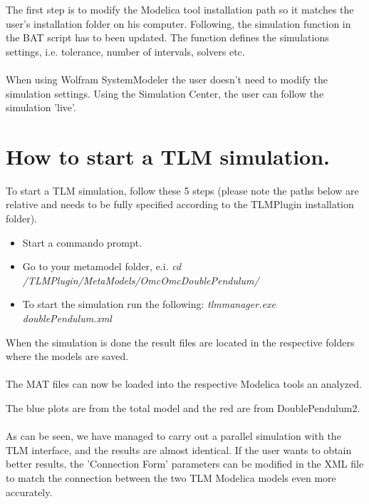 The first step is to modify the Modelica tool installation path so it matches the user's installation folder on his computer. Following, the simulation function in the BAT script has to been updated. The function defines the simulations settings, i.e. tolerance, number of intervals, solvers etc. \\\\When using Wolfram SystemModeler the user doesn't need to modify the simulation settings. Using the Simulation Center, the user can follow the simulation 'live'.

\section{How to start a TLM simulation.}

To start a TLM simulation, follow these 5 steps (please note the paths below are relative and needs to be fully specified according to the TLMPlugin installation folder).

\begin{itemize}
  \item Start a commando prompt.
  \item Go to your metamodel folder, e.i. \textit{cd /TLMPlugin/MetaModels/OmcOmcDoublePendulum/}
  \item To start the simulation run the following: \textit{tlmmanager.exe doublePendulum.xml}
\end{itemize}

When the simulation is done the result files are located in the respective folders where the models are saved. \\\\The MAT files can now be loaded into the respective Modelica tools an analyzed.

The blue plots are from the total model and the red are from DoublePendulum2. \\\\
As can be seen, we have managed to carry out a parallel simulation with the TLM interface, and the results are almost identical. If the user wants to obtain better results, the 'Connection Form' parameters can be modified in the XML file to match the connection between the two TLM Modelica models even more accurately.

